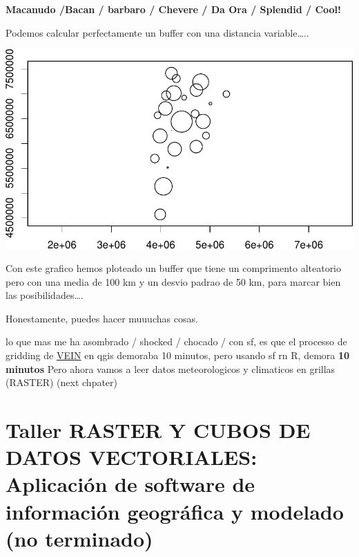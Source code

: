 \documentclass[]{book}
\newenvironment{Shaded}{\begin{snugshade}}{\end{snugshade}}
\newcommand{\CommentTok}[1]{\textcolor[rgb]{0.56,0.35,0.01}{\textit{#1}}}
\newcommand{\DataTypeTok}[1]{\textcolor[rgb]{0.13,0.29,0.53}{#1}}
\newcommand{\DecValTok}[1]{\textcolor[rgb]{0.00,0.00,0.81}{#1}}
\newcommand{\KeywordTok}[1]{\textcolor[rgb]{0.13,0.29,0.53}{\textbf{#1}}}
\newcommand{\NormalTok}[1]{#1}
\newcommand{\OperatorTok}[1]{\textcolor[rgb]{0.81,0.36,0.00}{\textbf{#1}}}
\newcommand{\StringTok}[1]{\textcolor[rgb]{0.31,0.60,0.02}{#1}}
\begin{document}
\textbf{Macanudo /Bacan / barbaro / Chevere / Da Ora / Splendid / Cool!}

Podemos calcular perfectamente un buffer con una distancia variable\ldots{}..

\begin{Shaded}
\end{Shaded}

\includegraphics{bookdown-demo_files/figure-latex/unnamed-chunk-54-1.pdf}

Con este grafico hemos ploteado un buffer que tiene un comprimento alteatorio pero con una media de 100 km y un desvio padrao de 50 km, para marcar bien las posibilidades\ldots{}.

Honestamente, puedes hacer muuuchas cosas.

lo que mas me ha asombrado / shocked / chocado / con sf, es que el processo de gridding de \href{https://rdrr.io/cran/vein/man/emis_grid.html}{VEIN} en qgis demoraba 10 minutos, pero usando sf rn R, demora \textbf{10 minutos}
Pero ahora vamos a leer datos meteorologicos y climaticos en grillas (RASTER)
(next chpater)

\hypertarget{taller-raster-y-cubos-de-datos-vectoriales-aplicacion-de-software-de-informacion-geografica-y-modelado-no-terminado}{%
\chapter{Taller RASTER Y CUBOS DE DATOS VECTORIALES: Aplicación de software de información geográfica y modelado (no terminado)}\label{taller-raster-y-cubos-de-datos-vectoriales-aplicacion-de-software-de-informacion-geografica-y-modelado-no-terminado}}
\end{document}
